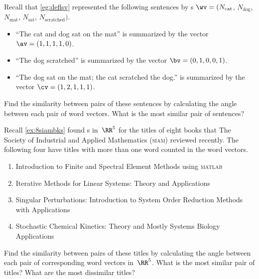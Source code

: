 \begin{exercise}  
Recall that \cref{eg:deflsv} represented the following sentences by s \(\wv=(N_{\text{cat}}\), \(N_{\text{dog}}\), \(N_{\text{mat}}\), \(N_{\text{sat}}\), \(N_{\text{scratched}})\).
\begin{itemize}
\item ``The cat and dog sat on the mat'' is summarized by the vector \(\av=(1,1,1,1,0)\).
\item ``The dog scratched'' is summarized by the vector \(\bv=(0,1,0,0,1)\).
\item  ``The dog sat on the mat; the cat scratched the dog.'' is summarized by the vector \(\cv=(1,2,1,1,1)\).
\end{itemize}
Find the similarity between pairs of these sentences by calculating the angle between each pair of word vectors.  
What is the most similar pair of sentences?

\end{exercise}



\begin{reduce}
\begin{exercise}  
Recall \cref{ex:8siambks} found s in~\(\RR^5\) for the titles of eight books that The Society of Industrial and Applied Mathematics (\textsc{siam}) reviewed recently.
The following four have titles with more than one word counted in the word vectors.
\begin{enumerate}
\item Introduction to Finite and Spectral Element Methods using \textsc{matlab}
\item Iterative Methods for Linear Systems: Theory and Applications 
\item Singular Perturbations: Introduction to System Order Reduction Methods with Applications 
\item Stochastic Chemical Kinetics: Theory and Mostly Systems Biology Applications
\end{enumerate}
Find the similarity between pairs of these titles by calculating the angle between each pair of corresponding word vectors in~\(\RR^5\).  
What is the most similar pair of titles?  
What are the most dissimilar titles?

\end{exercise}
\end{reduce}




